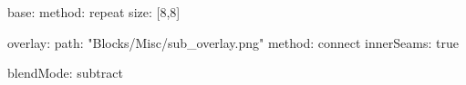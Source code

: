 base:
  method: repeat
  size: [8,8]

overlay:
  path: "Blocks/Misc/sub_overlay.png"
  method: connect
  innerSeams: true

blendMode: subtract